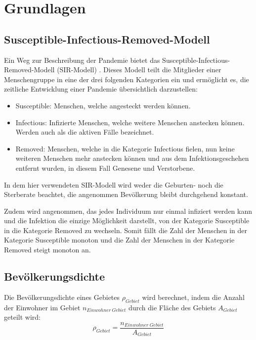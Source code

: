 \chapter{Grundlagen}\label{chap:Grundlagen}
\section{Susceptible-Infectious-Removed-Modell}
Ein Weg zur Beschreibung der Pandemie bietet das \glqq{}Susceptible-Infectious-Removed-Modell\grqq{} (SIR-Modell) \autocite{SIR}. Dieses Modell teilt die Mitglieder einer Menschengruppe in eine der drei folgenden Kategorien ein und ermöglicht es, die zeitliche Entwicklung einer Pandemie übersichtlich darzustellen:
\begin{itemize}
    \item \glqq{}Susceptible\grqq{}: Menschen, welche angesteckt werden können.
    \item \glqq{}Infectious\grqq{}: Infizierte Menschen, welche weitere Menschen anstecken können. Werden auch als \glqq{}die aktiven Fälle\grqq{} bezeichnet.
    \item \glqq{}Removed\grqq{}: Menschen, welche in die Kategorie \glqq{}Infectious\grqq{} fielen, nun keine weiteren Menschen mehr anstecken können und aus dem Infektionsgeschehen entfernt wurden,
    in diesem Fall Genesene und Verstorbene. 
\end{itemize}
In dem hier verwendeten SIR-Modell wird weder die Geburten- noch die Sterberate beachtet, die angenommen Bevölkerung bleibt durchgehend konstant.

Zudem wird angenommen, das jedes Individuum nur einmal infiziert werden kann und die Infektion die einzige Möglichkeit darstellt, von der Kategorie \glqq{}Susceptible\grqq{} in die Kategorie \glqq{}Removed\grqq{} zu wechseln.
Somit fällt die Zahl der Menschen in der Kategorie \glqq{}Susceptible\grqq{} monoton und die Zahl der Menschen in der Kategorie \glqq{}Removed\grqq{} steigt monoton an.

\section{Bevölkerungsdichte}
Die Bevölkerungsdichte eines Gebietes $\rho_{Gebiet}$ wird berechnet, indem die Anzahl der Einwohner im Gebiet $n_{Einwohner\ Gebiet}$ durch die Fläche des Gebiets $A_{Gebiet}$ geteilt wird:
\begin{equation}\label{eq:Bevölkerungsdichte}
    \rho_{Gebiet} = \frac{n_{Einwohner\  Gebiet}}{A_{Gebiet}}
\end{equation}
